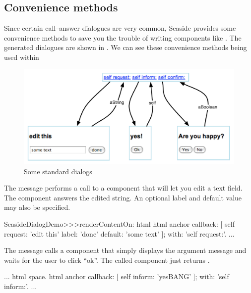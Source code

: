 \documentclass[a4paper,10pt,twoside]{book}
\begin{document}
{{\subsection{Convenience methods}

Since certain call--answer dialogues are very common, Seaside provides some convenience methods to save you the trouble of writing components like .
The generated dialogues are shown in .
We can see these convenience methods being used within 

\begin{figure}[b]
\begin{center}
\includegraphics[width=\textwidth]{dialogs}
\caption{Some standard dialogs}
\end{center}
\end{figure}

The message  performs a call to a component that will let you edit a text field.
The component answers the edited string.
An optional label and default value may also be specified.

\begin{code}{}
SeasideDialogDemo>>>renderContentOn: html
	html anchor
		callback: [ self request: 'edit this' label: 'done' default: 'some text' ];
		with: 'self request:'.
...
\end{code}

The message  calls a component that simply displays the argument message and waits for the user to click ``ok''.
The called component just returns .

\begin{code}{}
...
	html space.
	html anchor
		callback: [ self inform: 'yesBANG' ];
		with: 'self inform:'.
...
\end{code}

}}
\end{document}
